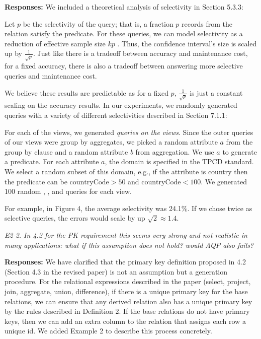 {\bf Responses:} We included a theoretical analysis of selectivity in Section 5.3.3:
\begin{displayquote}
Let $p$ be the selectivity of the query; that is, a fraction $p$ records from the relation satisfy the predicate.
For these queries, we can model selectivity as a reduction of effective sample size $kp$ .
Thus, the confidence interval's size is scaled up by $\frac{1}{\sqrt{p}}$.
Just like there is a tradeoff between accuracy and maintenance cost, for a fixed accuracy, 
there is also a tradeoff between answering more selective queries and maintenance cost.
\end{displayquote}
We believe these results are predictable as for a fixed $p$, $\frac{1}{\sqrt{p}}$ is just a constant scaling on the accuracy results.
In our experiments, we randomly generated queries with a variety of different selectivities described in Section 7.1.1:
\begin{displayquote}
For each of the views, we generated \emph{queries on the views}.
Since the outer queries of our views were group by aggregates, we picked a random attribute $a$ from the group by clause and a random attribute $b$ from aggregation.
We use $a$ to generate a predicate.
For each attribute $a$, the domain is specified in the TPCD standard.
We select a random subset of this domain, e.g., if the attribute is country then the predicate can be $\text{countryCode} > 50$ and $\text{countryCode} < 100$.
We generated 100 random \sumfunc, \avgfunc, and \countfunc queries for each view. 
\end{displayquote}
For example, in Figure 4, the average selectivity was 24.1\%.
If we chose twice as selective queries, the errors would scale by up $\sqrt{2} \approx 1.4$.

\vspace{1em}

\emph{E2-2. In 4.2 for the PK requirement  this seems very strong and not realistic in many applications: what if this assumption does not hold? would AQP also fails?}

\vspace{.25em}

{\bf Responses:} We have clarified that the primary key definition proposed in 4.2 (Section 4.3 in the revised paper) is not an assumption but a generation procedure. For the relational expressions described in the paper (select, project, join, aggregate, union, difference), if there is a unique primary key for the base relations, we can ensure that any derived relation also has a unique primary key by the rules described in Definition 2. If the base relations do not have primary keys, then we can add an extra column to the relation that assigns each row a unique id. We added Example 2 to describe this process concretely.

